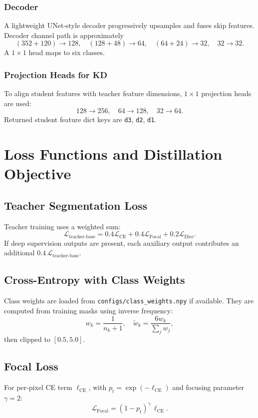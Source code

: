 \documentclass[journal]{IEEEtran}
\begin{document}
\subsubsection{Decoder}
A lightweight UNet-style decoder progressively upsamples and fuses skip features. Decoder channel path is approximately
\begin{equation}
(352+120)\to128,\quad(128+48)\to64,\quad(64+24)\to32,\quad32\to32.
\end{equation}
A $1\times1$ head maps to six classes.

\subsubsection{Projection Heads for KD}
To align student features with teacher feature dimensions, $1\times1$ projection heads are used:
\begin{equation}
128\to256,\quad64\to128,\quad32\to64.
\end{equation}
Returned student feature dict keys are \texttt{d3}, \texttt{d2}, \texttt{d1}.

\section{Loss Functions and Distillation Objective}
\subsection{Teacher Segmentation Loss}
Teacher training uses a weighted sum:
\begin{equation}
\mathcal{L}_{\text{teacher-base}}=0.4\mathcal{L}_{\text{CE}}+0.4\mathcal{L}_{\text{Focal}}+0.2\mathcal{L}_{\text{Dice}}.
\end{equation}
If deep supervision outputs are present, each auxiliary output contributes an additional $0.4\,\mathcal{L}_{\text{teacher-base}}$.

\subsection{Cross-Entropy with Class Weights}
Class weights are loaded from \texttt{configs/class\_weights.npy} if available. They are computed from training masks using inverse frequency:
\begin{equation}
w_k = \frac{1}{n_k+1}, \quad
\tilde{w}_k = \frac{6w_k}{\sum_j w_j},
\end{equation}
then clipped to $[0.5,5.0]$.

\subsection{Focal Loss}
For per-pixel CE term $\ell_{\text{CE}}$, with $p_t=\exp(-\ell_{\text{CE}})$ and focusing parameter $\gamma=2$:
\begin{equation}
\mathcal{L}_{\text{Focal}} = (1-p_t)^{\gamma}\,\ell_{\text{CE}}.
\end{equation}
\end{document}

